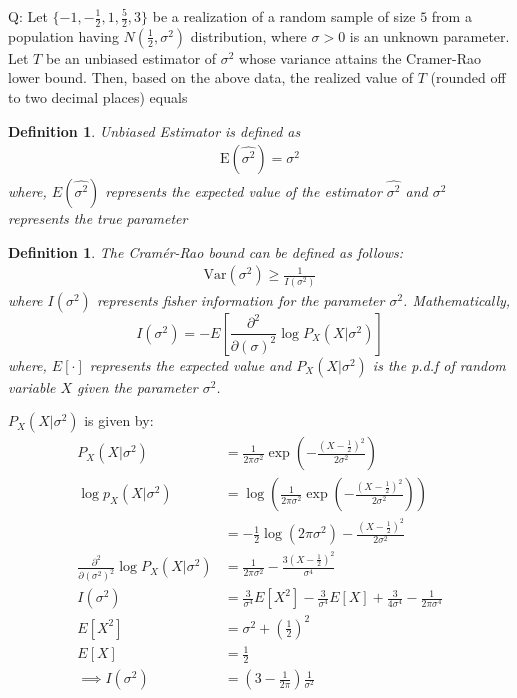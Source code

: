 \documentclass[journal,12pt,onecolumn]{IEEEtran}
\newtheorem{definition}[problem]{Definition}
\theoremstyle{remark}
\begin{document}
\let\vec\mathbf




\vspace{3cm}



\bigskip

\renewcommand{\thefigure}{\theenumi}
\renewcommand{\thetable}{\theenumi}
Q: Let $\{-1, -\frac{1}{2}, 1, \frac{5}{2}, 3\}$ be a realization of a random sample of size $5$ from a population having $N\left(\frac{1}{2}, \sigma^2\right)$ distribution, where $\sigma > 0$ is an unknown parameter. Let $T$ be an unbiased estimator of $\sigma^2$ whose variance attains the Cramer-Rao lower bound. Then, based on the above data, the realized value of $T$ (rounded off to two decimal places) equals
\\ \solution
\begin{definition}
Unbiased Estimator is defined as
\begin{align}
\text{E}(\hat{\sigma^2}) = {\sigma^2}
\end{align}
where, \(E(\hat{\sigma^2})\) represents the expected value of the estimator \(\hat{\sigma^2}\) and \(\sigma^2\) represents the true parameter
\end{definition}
\begin{definition}
The Cramér-Rao bound can be defined as follows:
\begin{align}
\text{Var}(\sigma^2) \geq \frac{1}{I(\sigma^2)}
\end{align}
where $I(\sigma^2)$ represents fisher information for the parameter $\sigma^2$.
Mathematically,
\begin{equation*}
I(\sigma^2) = -E\left [\frac{\partial^2}{\partial(\sigma)^2}\log P_{X}(X|\sigma^2)\right]
\end{equation*}
where, $E[\cdot]$ represents the expected value and $P_{X}(X|\sigma^2)$ is the p.d.f of random variable $X$ given the parameter $\sigma^2$. 
\end{definition}
$P_X(X|\sigma^2)$ is given by:
\begin{align}
P_X(X|\sigma^2) &= \frac{1}{2\pi\sigma^2} \exp\left(-\frac{(X-\frac{1}{2})^2}{2\sigma^2}\right)\\
\log p_X(X|\sigma^2) &= \log\left(\frac{1}{2\pi\sigma^2} \exp\left(-\frac{(X-\frac{1}{2})^2}{2\sigma^2}\right)\right)\\
&= -\frac{1}{2}\log(2\pi\sigma^2) - \frac{(X-\frac{1}{2})^2}{2\sigma^2}\\
\frac{\partial^2}{\partial(\sigma^2)^2}\log P_X(X|\sigma^2) &= \frac{1}{2\pi\sigma^2} - \frac{3(X-\frac{1}{2})^2}{\sigma^4}\\
I(\sigma^2) &= \frac{3}{\sigma^4} E[X^2] - \frac{3}{\sigma^4} E[X] + \frac{3}{4\sigma^4} - \frac{1}{2\pi\sigma^4}\\
E[X^2] &= \sigma^2 + \left(\frac{1}{2}\right)^2\\
E[X] &= \frac{1}{2}\\
\implies I(\sigma^2) &= \left(3 - \frac{1}{2\pi}\right) \frac{1}{\sigma^2}
\end{align}
\end{document}

